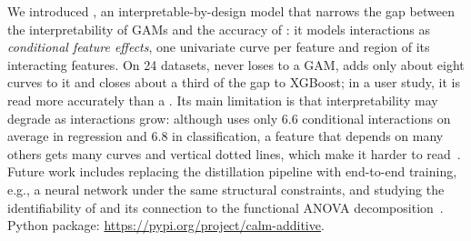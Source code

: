 We introduced \method{}, an interpretable-by-design model that narrows the gap between the interpretability of GAMs and the accuracy of \gamms{}: it models interactions as \emph{conditional feature effects}, one univariate curve per feature and region of its interacting features.
On 24 datasets, \method{} never loses to a GAM, adds only about eight curves to it and closes about a third of the gap to XGBoost; in a user study, it is read more accurately than a \gamm{}.
Its main limitation is that interpretability may degrade as interactions grow: although \method{} uses only 6.6 conditional interactions on average in regression and 6.8 in classification, a feature that depends on many others gets many curves and vertical dotted lines, which make it harder to read~\cite{abdul2020cogam}.
Future work includes replacing the distillation pipeline with end-to-end training, e.g., a neural network under the same structural constraints, and studying the identifiability of \method{} and its connection to the functional ANOVA decomposition~\cite{hooker2007generalized, lengerich2020purifying, hiabu2023unifying}.
Python package: \url{https://pypi.org/project/calm-additive}.
